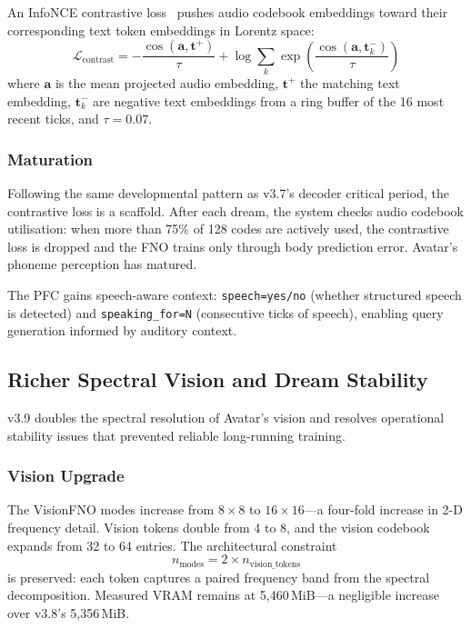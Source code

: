 An InfoNCE contrastive loss~\cite{oord2018cpc} pushes audio codebook embeddings toward their corresponding text token embeddings in Lorentz space:
\begin{equation}
\mathcal{L}_{\mathrm{contrast}} = -\frac{\cos(\mathbf{a}, \mathbf{t}^+)}{\tau} + \log \sum_{k} \exp\!\left(\frac{\cos(\mathbf{a}, \mathbf{t}_k^-)}{\tau}\right)
\label{eq:infonce}
\end{equation}
where $\mathbf{a}$ is the mean projected audio embedding, $\mathbf{t}^+$ the matching text embedding, $\mathbf{t}_k^-$ are negative text embeddings from a ring buffer of the 16 most recent ticks, and $\tau = 0.07$.

\subsubsection{Maturation}

Following the same developmental pattern as v3.7's decoder critical period, the contrastive loss is a scaffold. After each dream, the system checks audio codebook utilisation: when more than 75\% of 128 codes are actively used, the contrastive loss is dropped and the FNO trains only through body prediction error. Avatar's phoneme perception has matured.

The PFC gains speech-aware context: \texttt{speech=yes/no} (whether structured speech is detected) and \texttt{speaking\_for=N} (consecutive ticks of speech), enabling query generation informed by auditory context.

\subsection{Richer Spectral Vision and Dream Stability}
\label{sec:v39_vision}

v3.9 doubles the spectral resolution of Avatar's vision and resolves
operational stability issues that prevented reliable long-running training.

\subsubsection{Vision Upgrade}

The VisionFNO modes increase from $8{\times}8$ to $16{\times}16$---a four-fold
increase in 2-D frequency detail. Vision tokens double from 4 to 8, and the
vision codebook expands from 32 to 64 entries. The architectural constraint
\begin{equation}
  n_\text{modes} = 2 \times n_\text{vision\_tokens}
  \label{eq:vision_constraint}
\end{equation}
is preserved: each token captures a paired frequency band from the spectral
decomposition. Measured VRAM remains at 5,460\,MiB---a negligible increase over
v3.8's 5,356\,MiB.

